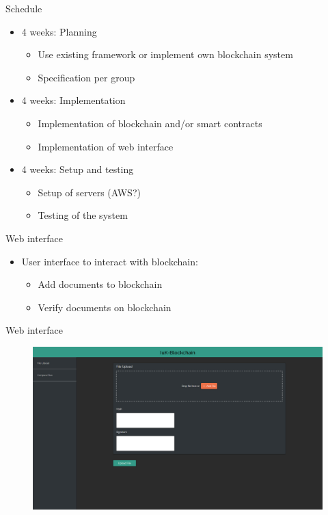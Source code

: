 \documentclass[10pt]{beamer}
\begin{document}
\begin{frame}{Schedule}
	\begin{itemize}
		\item 4 weeks: Planning
			\begin{itemize}
				\item Use existing framework or implement own blockchain system
				\item Specification per group
			\end{itemize}
		\item 4 weeks: Implementation
			\begin{itemize}
				\item Implementation of blockchain and/or smart contracts
				\item Implementation of web interface
			\end{itemize}
		\item 4 weeks: Setup and testing
			\begin{itemize}
				\item Setup of servers (AWS?)
				\item Testing of the system
			\end{itemize}
	\end{itemize}
\end{frame}

\begin{frame}{Web interface}
	\begin{itemize}
		\item User interface to interact with blockchain:
			\begin{itemize}
				\item Add documents to blockchain
				\item Verify documents on blockchain
			\end{itemize}
	\end{itemize}
\end{frame}

\begin{frame}{Web interface}
	\begin{figure}
		\includegraphics[width=1\textwidth]{images/GUI.jpg}
	\end{figure}
\end{frame}

\end{document}
